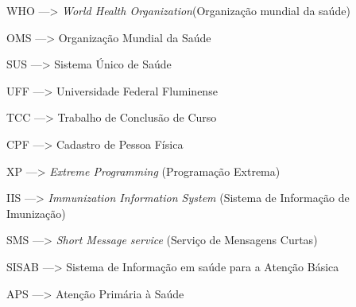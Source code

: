 \begin{siglas}
  \item [WHO]  ---> \textit{World Health Organization}(Organização mundial da saúde)
  \item [OMS]  ---> Organização Mundial da Saúde
  \item [SUS]  ---> Sistema Único de Saúde
  \item [UFF] ---> Universidade Federal Fluminense
  \item [TCC] ---> Trabalho de Conclusão de Curso
  \item [CPF] ---> Cadastro de Pessoa Física
  \item [XP] ---> \textit{Extreme Programming} (Programação Extrema)
  \item [IIS] ---> \textit{Immunization Information System} (Sistema de Informação de Imunização)
  \item [SMS] ---> \textit{Short Message service} (Serviço de Mensagens Curtas)
  \item [SISAB] ---> Sistema de Informação em saúde para a Atenção Básica
  \item [APS] ---> Atenção Primária à Saúde
\end{siglas}
